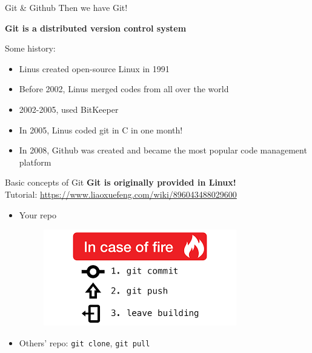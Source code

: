 \documentclass{../TexTemplate/myslide}
\begin{document}
\begin{frame}{Git \& Github}
Then we have Git!
\begin{center}
\textbf{Git is a distributed version control system}
\end{center}
Some history:
\begin{itemize}[<+->]
	\item Linus created open-source Linux in 1991
	\item Before 2002, Linus merged codes from all over the world
	\item 2002-2005, used BitKeeper
	\item In 2005, Linus coded git in C in one month!
	\item In 2008, Github was created and became the most popular code management platform
\end{itemize}
\end{frame}

\begin{frame}[fragile]{Basic concepts of Git}
\textbf{Git is originally provided in Linux!}\\
Tutorial: \url{https://www.liaoxuefeng.com/wiki/896043488029600}
\begin{itemize}
\item Your repo
\begin{figure}
\centering
\includegraphics[width=0.6\linewidth]{fig/fire-git.png}
\end{figure}
\item Others' repo: \verb'git clone', \verb'git pull'
\end{itemize}
\end{frame}
\end{document}
